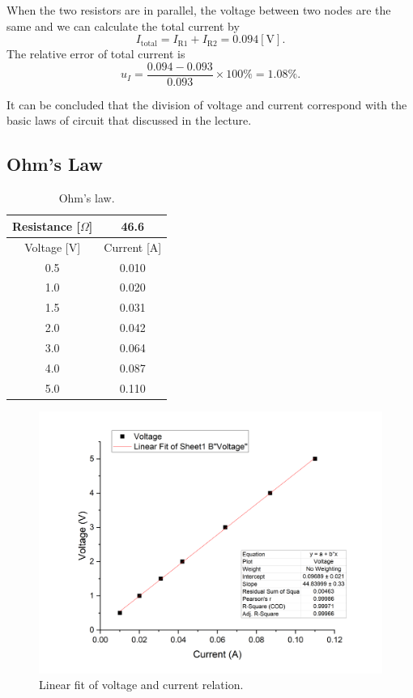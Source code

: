 \documentclass{article}
\begin{document}
When the two resistors are in parallel, the voltage between two nodes are the same and we can calculate the total current by 
$$I_{\text{total}} = I_{\text{R1}}+I_{\text{R2}} = 0.094 [\text{V}].$$
The relative error of total current is
$$u_I = \frac{0.094-0.093}{0.093}\times 100\% = 1.08\%.$$

It can be concluded that the division of voltage and current correspond with the basic laws of circuit that discussed in the lecture.


	\subsection{Ohm's Law}
\begin{table}[H]\centering
\begin{tabular}{cc}
\toprule
Resistance [$\Omega$] & 46.6\\
\midrule
Voltage [V] & Current [A]\\
\midrule
0.5 & 0.010\\
1.0 & 0.020\\
1.5 & 0.031\\
2.0 & 0.042\\
3.0 & 0.064\\
4.0 & 0.087\\
5.0 & 0.110\\
\bottomrule
\end{tabular}
\caption{Ohm's law.}\label{TableOhm}
\end{table}

\begin{figure}[H]\centering
\includegraphics[scale=0.4]{Ohm.png}
\caption{Linear fit of voltage and current relation.}\label{FigOhm}
\end{figure}
\end{document}
